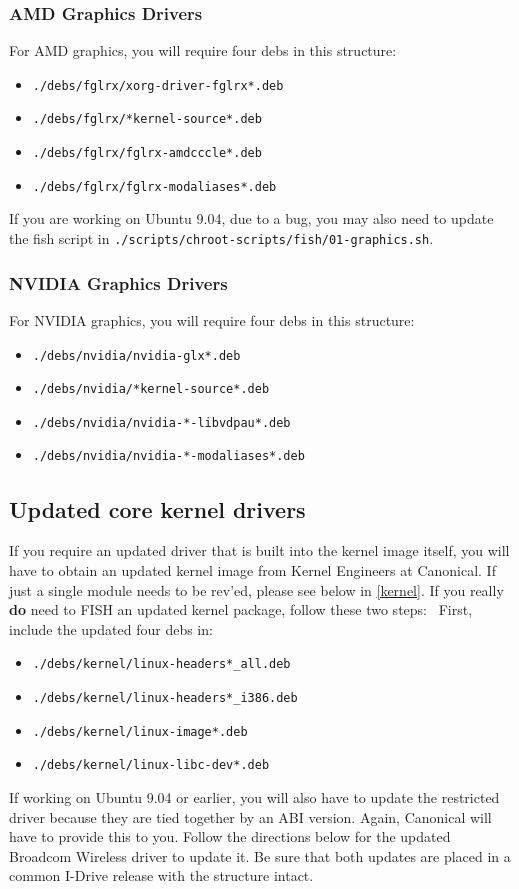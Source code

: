 \documentclass[letterpaper,10pt,titlepage]{article}
\begin{document}
\subsubsection{AMD Graphics Drivers}
For AMD graphics, you will require four debs in this structure:
\begin{itemize}
\item \texttt{./debs/fglrx/xorg-driver-fglrx*.deb}
\item \texttt{./debs/fglrx/*kernel-source*.deb}
\item \texttt{./debs/fglrx/fglrx-amdcccle*.deb}
\item \texttt{./debs/fglrx/fglrx-modaliases*.deb}
\end{itemize}

If you are working on Ubuntu 9.04, due to a bug, you may also need to update the fish script in 
\texttt{./scripts/chroot-scripts/fish/01-graphics.sh}.

\subsubsection{NVIDIA Graphics Drivers}

For NVIDIA graphics, you will require four debs in this structure:
\
\begin{itemize}
\item \texttt{./debs/nvidia/nvidia-glx*.deb}
\item \texttt{./debs/nvidia/*kernel-source*.deb}
\item \texttt{./debs/nvidia/nvidia-*-libvdpau*.deb}
\item \texttt{./debs/nvidia/nvidia-*-modaliases*.deb}
\end{itemize}


\subsection{Updated core kernel drivers}
If you require an updated driver that is built into the kernel image itself, you will have to obtain an updated kernel image from Kernel Engineers at Canonical.  If just a single module needs to be rev'ed, please see below in \ref{kernel}.  If you really \textbf{do} need to FISH an updated kernel package, follow these two steps:
\
First, include the updated four debs in:
\begin{itemize}
\item \texttt{./debs/kernel/linux-headers*_all.deb}
\item \texttt{./debs/kernel/linux-headers*_i386.deb}
\item \texttt{./debs/kernel/linux-image*.deb}
\item \texttt{./debs/kernel/linux-libc-dev*.deb}
\end{itemize}
If working on Ubuntu 9.04 or earlier, you will also have to update the restricted driver because they are tied together by an ABI version.  Again, Canonical will have to provide this to you.  Follow the directions below for the updated Broadcom Wireless driver to update it.  Be sure that both updates are placed in a common I-Drive release with the structure intact.
\end{document}
